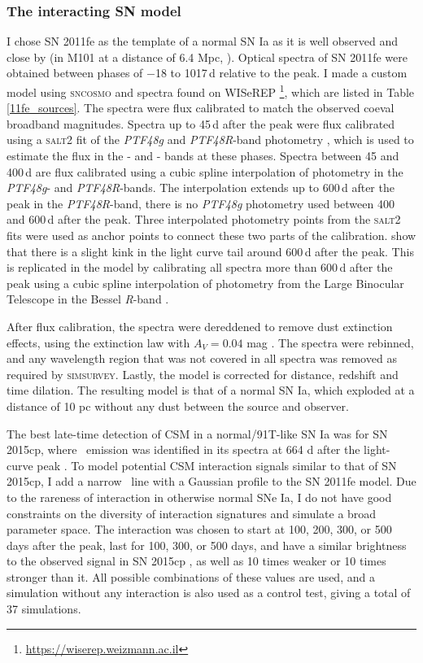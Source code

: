 \documentclass[a4paper,oneside,12pt, class=Latex/Classes/PhDthesisPSnPDF, crop=false]{standalone}
\begin{document}
\subsubsection{The interacting SN model}
\label{model_description}
I chose SN 2011fe as the template of a normal SN Ia as it is well observed and close by (in M101 at a distance of 6.4 Mpc, \citealt{M101_cep_dist}). Optical spectra of SN 2011fe were obtained between phases of $-$18 to 1017\,d relative to the peak. I made a custom model using \textsc{sncosmo} and spectra found on WISeREP \citep{wiserep}\footnote{\url{https://wiserep.weizmann.ac.il}}, which are listed in Table \ref{11fe_sources}. The spectra were flux calibrated to match the observed coeval broadband magnitudes. Spectra up to 45\,d after the peak were flux calibrated using a \textsc{salt2} \citep{salt2} fit of the \textit{PTF48g} and \textit{PTF48R}-band photometry \citep{PTF_1, PTF_2}, which is used to estimate the flux in the \ztfg- and \ztfr- bands at these phases. Spectra between 45 and 400\,d are flux calibrated using a cubic spline interpolation of photometry in the \textit{PTF48g}- and \textit{PTF48R}-bands. The interpolation extends up to 600\,d after the peak in the \textit{PTF48R}-band, there is no \textit{PTF48g} photometry used between 400 and 600\,d after the peak. Three interpolated photometry points from the \textsc{salt2} fits were used as anchor points to connect these two parts of the calibration. \citet{Georgios_11fe} show that there is a slight kink in the light curve tail around 600\,d after the peak. This is replicated in the model by calibrating all spectra more than 600\,d after the peak using a cubic spline interpolation of photometry from the Large Binocular Telescope \citep[LBT;][]{LBT} in the Bessel \textit{R}-band \citep{Shappee_11fe}.

After flux calibration, the spectra were dereddened to remove dust extinction effects, using the \citet{ccm89_extinction_law} extinction law with $A_V = 0.04$ mag \citep{extinction_Av}. The spectra were rebinned, and any wavelength region that was not covered in all spectra was removed as required by \textsc{simsurvey}. Lastly, the model is corrected for distance, redshift and time dilation. The resulting model is that of a normal SN Ia, which exploded at a distance of 10 pc without any dust between the source and observer.

 The best late-time detection of CSM in a normal/91T-like SN Ia was for SN 2015cp, where \Halpha\ emission was identified in its spectra at 664 d after the light-curve peak \citep{2015cp}. To model potential CSM interaction signals similar to that of SN 2015cp, I add a narrow \Halpha~line with a Gaussian profile to the SN 2011fe model. Due to the rareness of interaction in otherwise normal SNe Ia, I do not have good constraints on the diversity of interaction signatures and simulate a broad parameter space. The interaction was chosen to start at 100, 200, 300, or 500 days after the peak, last for 100, 300, or 500 days, and have a similar brightness to the observed signal in SN 2015cp \citep{2015cp}, as well as 10 times weaker or 10 times stronger than it. All possible combinations of these values are used, and a simulation without any interaction is also used as a control test, giving a total of 37 simulations. 
\end{document}
